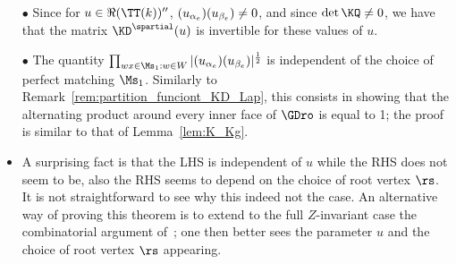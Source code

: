 \documentclass[a4paper,twoside,11pt]{article}
\begin{document}
\begin{rem}\label{rem:part_function}$\,$
\begin{itemize}
 \item[$\bullet$] Since for $u\in\Re(\TT(k))''$, $\sc(u_{\alpha_e})\sc(u_{\beta_e})\neq 0$, and since $\det\KQ\neq 0$, we have 
 that the matrix $\KD^\spartial(u)$ is invertible for these values of $u$.
 \item[$\bullet$] The quantity $\prod_{wx\in\Ms_1:w\in W}|\sc(u_{\alpha_e})\sc(u_{\beta_e})|^{\frac{1}{2}}$ is independent 
 of the choice of perfect matching $\Ms_1$. Similarly to Remark~\ref{rem:partition_funciont_KD_Lap}, this consists in showing that 
 the alternating product around every inner face of $\GDro$ is equal to 1; the proof is similar to that of 
 Lemma~\ref{lem:K_Kg}. 
 \item A surprising fact is that the LHS is independent of $u$ while the RHS does not seem to be, also the RHS seems to depend on 
 the choice of root vertex $\rs$. It is not straightforward to see why this indeed not the case. An alternative way of proving
 this theorem is to extend to the full $Z$-invariant case the combinatorial argument of~\cite{deTiliere:partition}; one then better sees the 
 parameter $u$ and the choice of root vertex $\rs$ appearing.
\end{itemize}
\end{rem}
\end{document}
